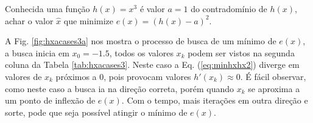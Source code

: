 \begin{example}\label{ex:minhxhx3}
Conhecida uma função $h(x)=x^3$ é valor $a=1$ do contradomínio de $h(x)$,
achar o valor $\hat{x}$ que minimize $e(x)=(h(x)-a)^2$.
\end{example}
\begin{SolutionT}\label{sol:minhxhx3}
 A Fig. \ref{fig:hxacases3a} nos mostra o processo de busca de um mínimo
 de $e(x)$, a busca inicia em $x_0=-1.5$,
 todos os valores $x_{k}$ podem ser vistos na segunda coluna da
Tabela \ref{tab:hxacases3}. Neste caso a Eq. (\ref{eq:minhxhx2}) diverge em 
valores de $x_{k}$ próximos a $0$, pois provocam valores  $h'(x_{k})\approx 0$.
É fácil observar, como neste caso a busca ia na direção correta,
porém quando $x_{k}$ se aproxima a um ponto de inflexão de $e(x)$.
Com o tempo, mais iterações em outra direção e sorte, 
pode que seja possível atingir o mínimo de $e(x)$.
\end{SolutionT}

